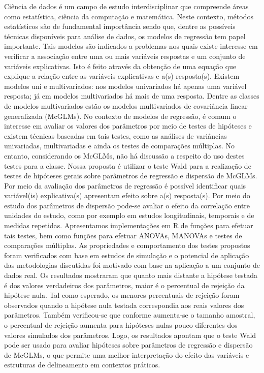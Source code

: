 \begin{resumo}

Ciência de dados é um campo de estudo interdisciplinar que compreende áreas como estatística, ciência da computação e matemática. Neste contexto, métodos estatísticos são de fundamental importância sendo que, dentre as possíveis técnicas disponíveis para análise de dados, os modelos de regressão tem papel importante. Tais modelos são indicados a problemas nos quais existe interesse em verificar a associação entre uma ou mais variáveis respostas e um conjunto de variáveis explicativas. Isto é feito através da obtenção de uma equação que explique a relação entre as variáveis explicativas e a(s) resposta(s). Existem modelos uni e multivariados: nos modelos univariados há apenas uma variável resposta; já em modelos multivariados há mais de uma resposta. Dentre as classes de modelos multivariados estão os modelos multivariados de covariância linear generalizada (McGLMs). No contexto de modelos de regressão, é comum o interesse em avaliar os valores dos parâmetros por meio de testes de hipóteses e existem técnicas baseadas em tais testes, como as análises de variâncias univariadas, multivariadas e ainda os testes de comparações múltiplas. No entanto, considerando os McGLMs, não há discussão a respeito do uso destes testes para a classe. Nossa proposta é utilizar o teste Wald para a realização de testes de hipóteses gerais sobre parâmetros de regressão e dispersão de McGLMs. Por meio da avaliação dos parâmetros de regressão é possível identificar quais variável(is) explicativa(s) apresentam efeito sobre a(s) resposta(s). Por meio do estudo dos parâmetros de dispersão pode-se avaliar o efeito da correlação entre unidades do estudo, como por exemplo em estudos longitudinais, temporais e de medidas repetidas. Apresentamos implementações em R de funções para efetuar tais testes, bem como funções para efetuar ANOVAs, MANOVAs e testes de comparações múltiplas. As propriedades e comportamento dos testes propostos foram verificados com base em estudos de simulação e o potencial de aplicação das metodologias discutidas foi motivado com base na aplicação a um conjunto de dados real. Os resultados mostraram que quanto mais distante a hipótese testada é dos valores verdadeiros dos parâmetros, maior é o percentual de rejeição da hipótese nula. Tal como esperado, os menores percentuais de rejeição foram observados quando a hipótese nula testada correspondia aos reais valores dos parâmetros. Também verificou-se que conforme aumenta-se o tamanho amostral, o percentual de rejeição aumenta para hipóteses nulas pouco diferentes dos valores simulados dos parâmetros. Logo, os resultados apontam que o teste Wald pode ser usado para avaliar hipóteses sobre parâmetros de regressão e dispersão de McGLMs, o que permite uma melhor interpretação do efeito das variáveis e estruturas de delineamento em contextos práticos.

\end{resumo}
